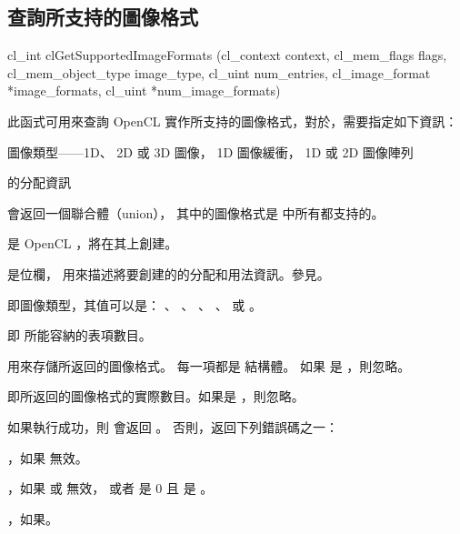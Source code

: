 \subsection{查詢所支持的圖像格式}


\startCLFUNC
cl_int clGetSupportedImageFormats (cl_context context,
			cl_mem_flags flags,
			cl_mem_object_type image_type,
			cl_uint num_entries,
			cl_image_format *image_formats,
			cl_uint *num_image_formats)
\stopCLFUNC

此函式可用來查詢 OpenCL 實作所支持的圖像格式，對於，需要指定如下資訊：
\startigBase
\item {}
\item 圖像類型——1D、 2D 或 3D 圖像， 1D 圖像緩衝， 1D 或 2D 圖像陣列
\item {}的分配資訊
\stopigBase

 會返回一個聯合體（union），
其中的圖像格式是  中所有都支持的。

 是 OpenCL ，將在其上創建。

 是位欄，
用來描述將要創建的的分配和用法資訊。參見。

 即圖像類型，其值可以是：
、 、
、 、
 或 。

 即  所能容納的表項數目。

 用來存儲所返回的圖像格式。
每一項都是  結構體。
如果  是 ，則忽略。

 即所返回的圖像格式的實際數目。如果是 ，則忽略。

如果執行成功，則  會返回 。
否則，返回下列錯誤碼之一：
\startigBase
\item {}，如果  無效。

\item {}，如果  或  無效，
或者  是 0 且  是 。

\item {}，如果\scdevfailres。


